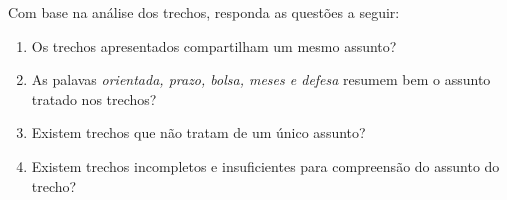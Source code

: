 

\vspace{0.5 cm} 
\noindent Com base na análise dos trechos, responda as questões a seguir:
\vspace{0.5 cm} 


\begin{enumerate}



\item Os trechos apresentados compartilham um mesmo assunto?
\likertB




\item As palavas \textit{orientada, prazo, bolsa, meses e defesa} resumem bem o assunto tratado nos trechos?
\likertB




\item Existem trechos que não tratam de um único assunto?
\likertA



\item Existem trechos incompletos e insuficientes para compreensão do assunto do trecho?
\likertA



\end{enumerate}







%
%
%
%
%
















